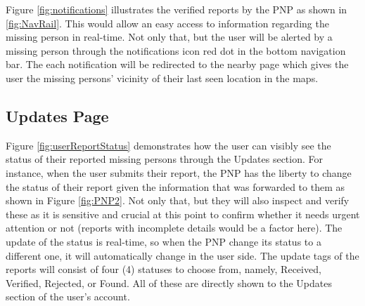 Figure \ref{fig:notifications} illustrates the verified reports by the PNP as shown in \ref{fig:NavRail}. This would allow an easy access to information regarding the missing person in real-time. Not only that, but the user will be alerted by a missing person through the notifications icon red dot in the bottom navigation bar. The each notification will be redirected to the nearby page which gives the user the missing persons' vicinity of their last seen location in the maps.  

\subsection{Updates Page}

Figure \ref{fig:userReportStatus} demonstrates how the user can visibly see the status of their reported missing persons through the Updates section. For instance, when the user submits their report, the PNP has the liberty to change the status of their report given the information that was forwarded to them as shown in Figure \ref{fig:PNP2}. Not only that, but they will also inspect and verify these as it is sensitive and crucial at this point to confirm whether it needs urgent attention or not (reports with incomplete details would be a factor here). The update of the status is real-time, so when the PNP change its status to a different one, it will automatically change in the user side. The update tags of the reports will consist of four (4) statuses to choose from, namely, Received, Verified, Rejected, or Found. All of these are directly shown to the Updates section of the user's account.

